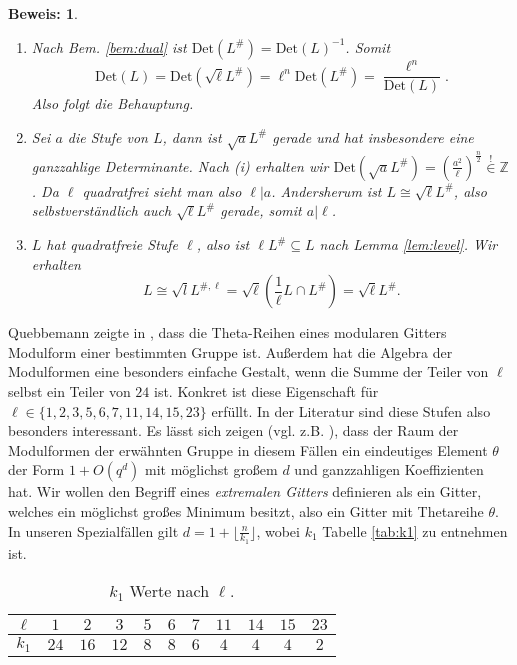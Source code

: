 \documentclass[12pt,a4paper,halfparskip,headsepline,bibtotocnumbered]{scrreprt}
\theoremstyle{nummermitklammern}
\theoremstyle{nonumberbreak}
\newtheorem{beweis}{Beweis:}
\newcommand{\Z}{\mathbb{Z}}
\newcommand{\Det}{\text{Det}}
\begin{document}
\begin{beweis}
	\begin{enumerate}[label=(\roman*)]
		\item Nach Bem. \eqref{bem:dual} ist $\Det(L^\#) = \Det(L)^{-1}$. Somit
			\begin{equation*}
				\Det(L) = \Det(\sqrt{\ell} L^\#) = \ell^n \Det(L^\#) = \frac{\ell^n}{\Det(L)}.
			\end{equation*}
			Also folgt die Behauptung.
		\item Sei $a$ die Stufe von $L$, dann ist $\sqrt{a}L^\#$ gerade und hat insbesondere eine ganzzahlige Determinante. Nach (i) erhalten wir $\Det(\sqrt{a}L^\#) = \left( \frac{a^2}{\ell} \right) ^\frac{n}{2} \stackrel{!}{\in} \Z$. Da $\ell$ quadratfrei sieht man also $\ell \vert a$. Andersherum ist $L \cong \sqrt{\ell}L^\#$, also selbstverständlich auch $\sqrt{\ell} L^\#$ gerade, somit $a \vert \ell$.
		\item $L$ hat quadratfreie Stufe $\ell$, also ist $\ell L^\# \subseteq L$ nach Lemma \eqref{lem:level}. Wir erhalten
			\begin{equation*}
				L \cong \sqrt{l} L^{\#,\ell} = \sqrt{\ell} \left( \frac{1}{\ell} L \cap L^\# \right) = \sqrt{\ell} L^\#.
			\end{equation*}
	\end{enumerate}
\end{beweis}

Quebbemann zeigte in \cite{quebbemann}, dass die Theta-Reihen eines modularen Gitters Modulform einer bestimmten Gruppe ist. Außerdem hat die Algebra der Modulformen eine besonders einfache Gestalt, wenn die Summe der Teiler von $\ell$ selbst ein Teiler von $24$ ist. Konkret ist diese Eigenschaft für $\ell \in \lbrace 1,2,3,5,6,7,11,14,15,23 \rbrace$ erfüllt. In der Literatur sind diese Stufen also besonders interessant. Es lässt sich zeigen (vgl. z.B. \cite[1.2.2]{juergens}), dass der Raum der Modulformen der erwähnten Gruppe in diesem Fällen ein eindeutiges Element $\theta$ der Form $1 + O(q^d)$ mit möglichst großem $d$ und ganzzahligen Koeffizienten hat. Wir wollen den Begriff eines \textit{extremalen Gitters} definieren als ein Gitter, welches ein möglichst großes Minimum besitzt, also ein Gitter mit Thetareihe $\theta$. In unseren Spezialfällen gilt $d = 1 + \lfloor \frac{n}{k_1} \rfloor$, wobei $k_1$ Tabelle \eqref{tab:k1} zu entnehmen ist.

\begin{table}
	\centering
	\begin{tabular}{c|c|c|c|c|c|c|c|c|c|c}
		$\ell$	&$1$	&$2$	&$3$	&$5$	&$6$	&$7$	&$11$	&$14$	&$15$	&$23$\\
		\hline
		$k_1$		&$24$	&$16$	&$12$	&$8$	&$8$	&$6$	&$4$	&$4$	&$4$	&$2$
	\end{tabular}
	\caption{$k_1$ Werte nach $\ell$.\label{tab:k1}}
\end{table}
\end{document}
